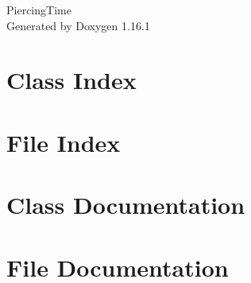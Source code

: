 \documentclass[twoside]{book}
\newcommand{\+}{\discretionary{\mbox{\scriptsize$\hookleftarrow$}}{}{}}
\newcommand{\clearemptydoublepage}{%
    \newpage{\pagestyle{empty}\cleardoublepage}%
  }
\begin{document}
  \raggedbottom
    \hypersetup{pageanchor=false,
                bookmarksnumbered=true,
                pdfencoding=unicode
               }
  \begin{titlepage}
  \vspace*{7cm}
  \begin{center}%
  {\Large Piercing\+Time}\\
  \vspace*{1cm}
  {\large Generated by Doxygen 1.16.1}\\
  \end{center}
  \end{titlepage}
  \clearemptydoublepage
  \tableofcontents
  \clearemptydoublepage
  \hypersetup{pageanchor=true}
\chapter{Class Index}

\chapter{File Index}

\chapter{Class Documentation}

















\chapter{File Documentation}














  \backmatter
  \newpage
  \clearemptydoublepage
  \printindex
\end{document}
